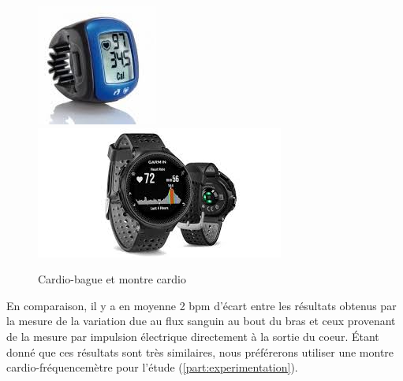          \begin{figure}[H]
                \centering
                \includegraphics[scale=0.8]{images/cardiobague.jpg}
                \includegraphics[scale=0.7]{images/garmin.jpg}
                \caption{\label{fig:cardiobague}Cardio-bague et montre cardio}
            \end{figure}


     En comparaison, il y a en moyenne 2 bpm d'écart entre les résultats obtenus par la mesure de la variation due au flux sanguin au bout du bras et ceux provenant de la mesure par impulsion électrique directement à la sortie du coeur. Étant donné que ces résultats sont très similaires, nous préférerons utiliser une montre cardio-fréquencemètre pour l'étude (\autoref{part:experimentation}).
        

   






    
        

